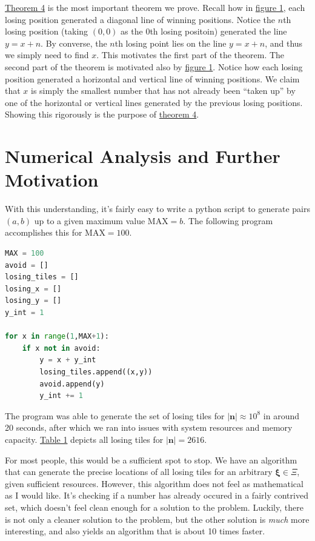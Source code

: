 \documentclass[11pt, letterpaper]{article}
\begin{document}
\hyperref[thm:4]{Theorem 4} is the most important theorem we prove. Recall how in \hyperref[fig:1]{figure 1}, each losing position generated a diagonal line of winning positions. Notice the $n$th losing position (taking $(0,0)$ as the 0th losing positoin) generated the line $y=x+n$. By converse, the $n$th losing point lies on the line $y=x+n$, and thus we simply need to find $x$. This motivates the first part of the theorem. The second part of the theorem is motivated also by \hyperref[fig:1]{figure 1}. Notice how each losing position generated a horizontal and vertical line of winning positions. We claim that $x$ is simply the smallest number that has not already been ``taken up'' by one of the horizontal or vertical lines generated by the previous losing positions. Showing this rigorously is the purpose of \hyperref[thm:4]{theorem 4}.








\section{Numerical Analysis and Further Motivation}\label{sec:3}
With this understanding, it's fairly easy to write a python script to generate pairs $(a,b)$ up to a given maximum value $\text{MAX}=b$. The following program accomplishes this for $\text{MAX}=100$.
\begin{lstlisting}[language=python]
MAX = 100
avoid = []
losing_tiles = []
losing_x = []
losing_y = []
y_int = 1

for x in range(1,MAX+1):
    if x not in avoid:
        y = x + y_int
        losing_tiles.append((x,y))
        avoid.append(y)
        y_int += 1
\end{lstlisting}
The program was able to generate the set of losing tiles for $\left| \mathbf{n}  \right| \approx 10^8$ in around 20 seconds, after which we ran into issues with system resources and memory capacity. \hyperref[tab:1]{Table 1} depicts all losing tiles for $\left| \mathbf{n} \right| =2616$.

For most people, this would be a sufficient spot to stop. We have an algorithm that can generate the precise locations of all losing tiles for an arbitrary $\boldsymbol{\xi} \in\Xi  $, given sufficient resources. However, this algorithm does not feel as mathematical as I would like. It's checking if a number has already occured in a fairly contrived set, which doesn't feel clean enough for a solution to the problem. Luckily, there is not only a cleaner solution to the problem, but the other solution is \emph{much} more interesting, and also yields an algorithm that is about 10 times faster.
\end{document}
